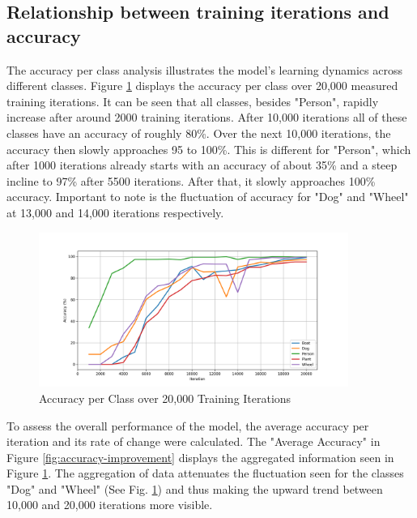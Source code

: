\subsection{Relationship between training iterations and accuracy}
The accuracy per class analysis illustrates the model's learning dynamics across different classes.
Figure \ref{fig:accuracy-vs-training-iterations} displays the accuracy per class over 20,000 measured training iterations.
It can be seen that all classes, besides "Person", rapidly increase after around 2000 training iterations. After 10,000 iterations
all of these classes have an accuracy of roughly 80\%. Over the next 10,000 iterations, the accuracy then slowly approaches 95 to 100\%.
This is different for "Person", which after 1000 iterations already starts with an accuracy of about 35\% and a steep incline to 97\%
after 5500 iterations. After that, it slowly approaches 100\% accuracy.
Important to note is the fluctuation of accuracy for "Dog" and "Wheel" at 13,000 and 14,000 iterations respectively.\\ 

\begin{figure}[h]
   \centering
   \includegraphics[width=0.9\textwidth]{../Data/accuracy-graph.png}
   \caption{Accuracy per Class over 20,000 Training Iterations}
   \label{fig:accuracy-vs-training-iterations}
\end{figure}

To assess the overall performance of the model, the average accuracy per iteration and its rate of change were calculated.
The "Average Accuracy" in Figure \ref{fig:accuracy-improvement} displays the aggregated information seen in Figure 
\ref{fig:accuracy-vs-training-iterations}. The aggregation of data attenuates the fluctuation seen for the classes "Dog" and "Wheel" 
(See Fig. \ref{fig:accuracy-vs-training-iterations}) and thus making the upward trend between 10,000 and 20,000 iterations more visible. \\ 

